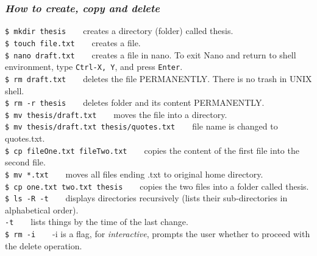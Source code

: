 \documentclass{article}
\begin{document}
\subsubsection{\small\textsl{How to create, copy and delete}}
\texttt{\$ mkdir thesis} ~ ~ creates a directory (folder) called thesis.\\
\texttt{\$ touch file.txt} ~ ~ creates a file.\\
\texttt{\$ nano draft.txt} ~	~ creates a file in nano. To exit Nano and return to shell environment, type \texttt{Ctrl-X, Y}, and press \texttt{Enter}.\\
\texttt{\$ rm draft.txt} ~ ~ deletes the file PERMANENTLY. There is no trash in UNIX shell.\\
\texttt{\$ rm -r thesis} ~ ~ deletes folder and its content PERMANENTLY.\\
\texttt{\$ mv thesis/draft.txt} ~ ~ moves the file into a directory.\\
\texttt{\$ mv thesis/draft.txt thesis/quotes.txt} ~ ~  file name is changed to quotes.txt. \\
\texttt{\$ cp fileOne.txt fileTwo.txt} ~	~ copies the content of the first file into the second file.\\
\texttt{\$ mv *.txt} ~ ~ 	moves all files ending .txt to original home directory.\\
\texttt{\$ cp one.txt two.txt thesis} ~ ~ copies the two files into a folder called thesis.\\
\texttt{\$ ls -R -t} ~ ~ displays directories recursively (lists their sub-directories in  alphabetical order).\\
\texttt{-t} ~ ~ lists things by the time of the last change.\\
\texttt{\$ rm -i} ~ ~ -i is a flag, for \textit{interactive}, prompts the user whether to proceed with the delete operation.
\end{document}
